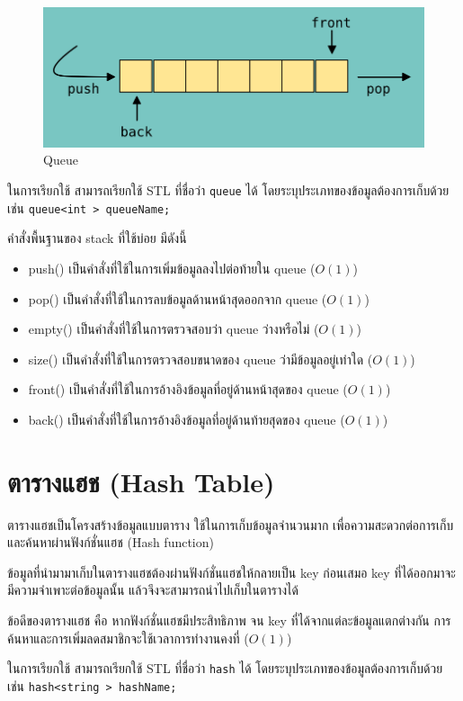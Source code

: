 \begin{figure}[h!]
    \centering
    \includegraphics[width=13cm]{images/queue}
    \caption{Queue}
    \label{fig:queue}
\end{figure}
ในการเรียกใช้ สามารถเรียกใช้ STL ที่ชื่อว่า \texttt{queue} ได้ โดยระบุประเภทของข้อมูลต้องการเก็บด้วย เช่น \texttt{queue<int > queueName;}

คำสั่งพื้นฐานของ stack ที่ใช้บ่อย มีดังนี้
\begin{itemize}
\item push() เป็นคำสั่งที่ใช้ในการเพิ่มข้อมูลลงไปต่อท้ายใน queue ($O(1)$)
\item pop() เป็นคำสั่งที่ใช้ในการลบข้อมูลด้านหน้าสุดออกจาก queue ($O(1)$)
\item empty() เป็นคำสั่งที่ใช้ในการตรวจสอบว่า queue ว่างหรือไม่ ($O(1)$)
\item size() เป็นคำสั่งที่ใช้ในการตรวจสอบขนาดของ queue ว่ามีข้อมูลอยู่เท่าใด ($O(1)$)
\item front() เป็นคำสั่งที่ใช้ในการอ้างอิงข้อมูลที่อยู่ด้านหน้าสุดของ queue ($O(1)$)
\item back() เป็นคำสั่งที่ใช้ในการอ้างอิงข้อมูลที่อยู่ด้านท้ายสุดของ queue ($O(1)$)
\end{itemize}

\section{ตารางแฮช (Hash Table)}

ตารางแฮชเป็นโครงสร้างข้อมูลแบบตาราง ใช้ในการเก็บข้อมูลจำนวนมาก เพื่อความสะดวกต่อการเก็บและค้นหาผ่านฟังก์ชั่นแฮช (Hash function)

ข้อมูลที่นำมามาเก็บในตารางแฮชต้องผ่านฟังก์ชั่นแฮชให้กลายเป็น key ก่อนเสมอ key ที่ได้ออกมาจะมีความจำเพาะต่อข้อมูลนั้น แล้วจึงจะสามารถนำไปเก็บในตารางได้

ข้อดีของตารางแฮช คือ หากฟังก์ชั่นแฮชมีประสิทธิภาพ จน key ที่ได้จากแต่ละข้อมูลแตกต่างกัน การค้นหาและการเพิ่มลดสมาชิกจะใช้เวลาการทำงานคงที่ ($O(1)$)

ในการเรียกใช้ สามารถเรียกใช้ STL ที่ชื่อว่า \texttt{hash} ได้ โดยระบุประเภทของข้อมูลต้องการเก็บด้วย เช่น \texttt{hash<string > hashName;}

